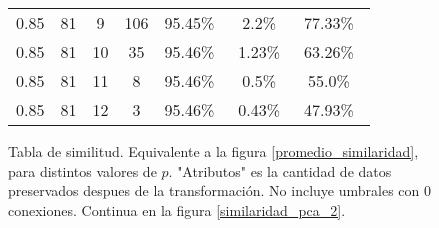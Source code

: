 \begin{figure}[!htbp]
{\begin{tabular}{ |c|c|c|c|c|c|c| }
        0.85             &81             &9            &106                 & 95.45\%\     & 2.2\%\               & 77.33\%\ \\
        0.85             &81             &10            &35                 & 95.46\%\     & 1.23\%\               & 63.26\%\ \\
        0.85             &81             &11            &8                 & 95.46\%\     & 0.5\%\               & 55.0\%\ \\
        0.85             &81             &12            &3                 & 95.46\%\     & 0.43\%\               & 47.93\%\ \\
        \hline
        \end{tabular}
    }
    \bigskip
    \caption{Tabla de similitud. Equivalente a la figura \ref{promedio_similaridad}, para distintos valores de $p$. "Atributos" es la cantidad de datos preservados despues de la transformación. No incluye umbrales con 0 conexiones. Continua en la figura \ref{similaridad_pca_2}.} \label{similaridad_pca}
\end{figure}


